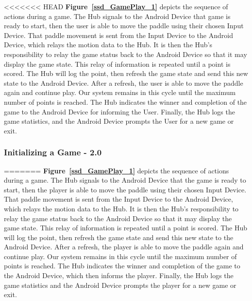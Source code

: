 \documentclass[12pt]{article}
\newenvironment{itemize*}%
  {\begin{itemize}%
  	\setlength{\parsep}{0pt}
    \setlength{\itemsep}{0pt}%
    \setlength{\parskip}{0pt}}%
  {\end{itemize}}
\begin{document}
\begin{itemize*}
<<<<<<< HEAD
\textbf{Figure~\ref{ssd_GamePlay_1}} depicts the sequence of actions during a game.  The Hub signals to the Android Device that game is ready to start, then the user is able to move the paddle using their chosen Input Device.  That paddle movement is sent from the Input Device to the Android Device, which relays the motion data to the Hub.  It is then the Hub's responsibility to relay the game status back to the Android Device so that it may display the game state.  This relay of information is repeated until a point is scored.  The Hub will log the point, then refresh the game state and send this new state to the Android Device.  After a refresh, the user is able to move the paddle again and continue play.  Our system remains in this cycle until the maximum number of points is reached.  The Hub indicates the winner and completion of the game to the Android Device for informing the User.  Finally, the Hub logs the game statistics, and the Android Device prompts the User for a new game or exit.

\subsubsection*{Initializing a Game - 2.0}
=======
\textbf{Figure~\ref{ssd_GamePlay_1}} depicts the sequence of actions during a game.  The Hub signals to the Android Device that the game is ready to start, then the player is able to move the paddle using their chosen Input Device.  That paddle movement is sent from the Input Device to the Android Device, which relays the motion data to the Hub.  It is then the Hub's responsibility to relay the game status back to the Android Device so that it may display the game state.  This relay of information is repeated until a point is scored.  The Hub will log the point, then refresh the game state and send this new state to the Android Device.  After a refresh, the player is able to move the paddle again and continue play.  Our system remains in this cycle until the maximum number of points is reached.  The Hub indicates the winner and completion of the game to the Android Device, which then informs the player.  Finally, the Hub logs the game statistics and the Android Device prompts the player for a new game or exit.


\end{itemize*}
\end{document}

